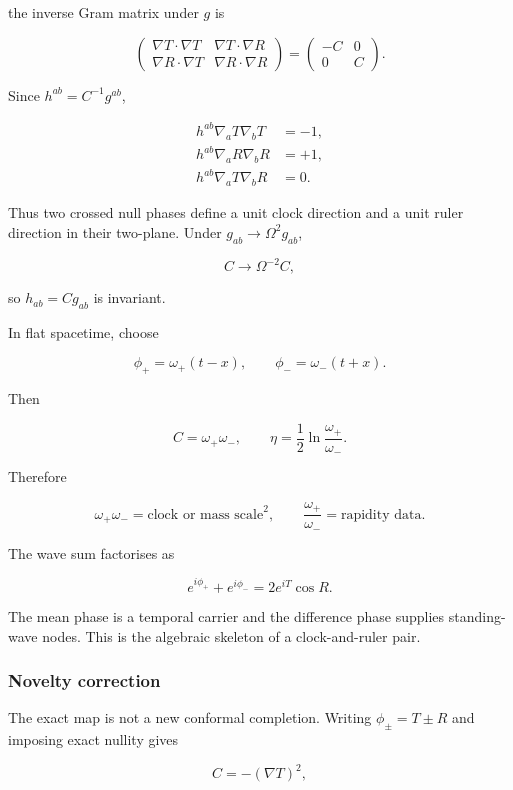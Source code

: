 \documentclass[
]{article}
\begin{document}
the inverse Gram matrix under \(g\) is

\[
\begin{pmatrix}
\nabla T\cdot\nabla T & \nabla T\cdot\nabla R\\
\nabla R\cdot\nabla T & \nabla R\cdot\nabla R
\end{pmatrix}
=
\begin{pmatrix}
-C&0\\
0&C
\end{pmatrix}.
\]

Since \(h^{ab}=C^{-1}g^{ab}\),

\[
\boxed{
\begin{aligned}
h^{ab}\nabla_aT\nabla_bT&=-1,\\
h^{ab}\nabla_aR\nabla_bR&=+1,\\
h^{ab}\nabla_aT\nabla_bR&=0.
\end{aligned}}
\]

Thus two crossed null phases define a unit clock direction and a unit
ruler direction in their two-plane. Under
\(g_{ab}\rightarrow\Omega^2g_{ab}\),

\[
C\rightarrow\Omega^{-2}C,
\]

so \(h_{ab}=Cg_{ab}\) is invariant.

In flat spacetime, choose

\[
\phi_+=\omega_+(t-x),
\qquad
\phi_-=\omega_-(t+x).
\]

Then

\[
C=\omega_+\omega_-,
\qquad
\eta=\frac12\ln\frac{\omega_+}{\omega_-}.
\]

Therefore

\[
\boxed{
\omega_+\omega_- = \text{clock or mass scale}^{2},
\qquad
\frac{\omega_+}{\omega_-}=\text{rapidity data}.
}
\]

The wave sum factorises as

\[
e^{i\phi_+}+e^{i\phi_-}=2e^{iT}\cos R.
\]

The mean phase is a temporal carrier and the difference phase supplies
standing-wave nodes. This is the algebraic skeleton of a clock-and-ruler
pair.

\subsubsection{Novelty correction}\label{novelty-correction}

The exact map is not a new conformal completion. Writing
\(\phi_\pm=T\pm R\) and imposing exact nullity gives

\[
C=-(\nabla T)^2,
\]
\end{document}
